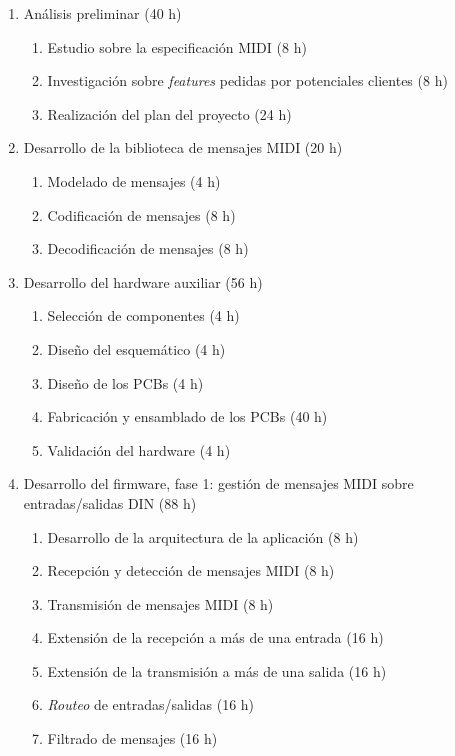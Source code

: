 \documentclass[
11pt, %
]{charter}
\begin{document}
\begin{enumerate}
	\item Análisis preliminar (40 h)
	\begin{enumerate}
		\item Estudio sobre la especificación MIDI (8 h)
		\item Investigación sobre \emph{features} pedidas por potenciales clientes (8 h)
		\item Realización del plan del proyecto (24 h)
	\end{enumerate}
	\item Desarrollo de la biblioteca de mensajes MIDI (20 h)
	\begin{enumerate}
		\item Modelado de mensajes (4 h)
		\item Codificación de mensajes (8 h)
		\item Decodificación de mensajes (8 h)
	\end{enumerate}
	
	\item Desarrollo del hardware auxiliar (56 h)
	\begin{enumerate}
		\item Selección de componentes (4 h)
		\item Diseño del esquemático (4 h)
		\item Diseño de los PCBs (4 h)
		\item Fabricación y ensamblado de los PCBs (40 h)
		\item Validación del hardware (4 h)
	\end{enumerate}

	\item Desarrollo del firmware, fase 1: gestión de mensajes MIDI sobre entradas/salidas DIN (88 h)
	\begin{enumerate}
		\item Desarrollo de la arquitectura de la aplicación (8 h)
		\item Recepción y detección de mensajes MIDI (8 h)
		\item Transmisión de mensajes MIDI (8 h)
		\item Extensión de la recepción a más de una entrada (16 h)
		\item Extensión de la transmisión a más de una salida (16 h)
		\item \emph{Routeo} de entradas/salidas (16 h)
		\item Filtrado de mensajes (16 h)
	\end{enumerate}
	

\end{enumerate}
\end{document}
